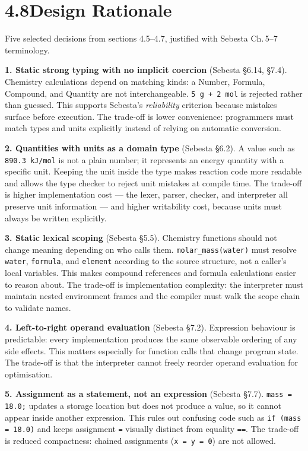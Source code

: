 \documentclass[11pt,a4paper]{article}
\newcommand{\code}[1]{\texttt{#1}}
\begin{document}
\section{4.8\quad Design Rationale}

Five selected decisions from sections 4.5--4.7, justified with Sebesta Ch.\,5--7 terminology.

\textbf{1. Static strong typing with no implicit coercion} (Sebesta \S6.14, \S7.4). Chemistry calculations depend on matching kinds: a Number, Formula, Compound, and Quantity are not interchangeable. \code{5 g + 2 mol} is rejected rather than guessed. This supports Sebesta's \emph{reliability} criterion because mistakes surface before execution. The trade-off is lower convenience: programmers must match types and units explicitly instead of relying on automatic conversion.

\textbf{2. Quantities with units as a domain type} (Sebesta \S6.2). A value such as \code{890.3 kJ/mol} is not a plain number; it represents an energy quantity with a specific unit. Keeping the unit inside the type makes reaction code more readable and allows the type checker to reject unit mistakes at compile time. The trade-off is higher implementation cost --- the lexer, parser, checker, and interpreter all preserve unit information --- and higher writability cost, because units must always be written explicitly.

\textbf{3. Static lexical scoping} (Sebesta \S5.5). Chemistry functions should not change meaning depending on who calls them. \code{molar\_mass(water)} must resolve \code{water}, \code{formula}, and \code{element} according to the source structure, not a caller's local variables. This makes compound references and formula calculations easier to reason about. The trade-off is implementation complexity: the interpreter must maintain nested environment frames and the compiler must walk the scope chain to validate names.

\textbf{4. Left-to-right operand evaluation} (Sebesta \S7.2). Expression behaviour is predictable: every implementation produces the same observable ordering of any side effects. This matters especially for function calls that change program state. The trade-off is that the interpreter cannot freely reorder operand evaluation for optimisation.

\textbf{5. Assignment as a statement, not an expression} (Sebesta \S7.7). \code{mass = 18.0;} updates a storage location but does not produce a value, so it cannot appear inside another expression. This rules out confusing code such as \code{if (mass = 18.0)} and keeps assignment \code{=} visually distinct from equality \code{==}. The trade-off is reduced compactness: chained assignments (\code{x = y = 0}) are not allowed.
\end{document}
